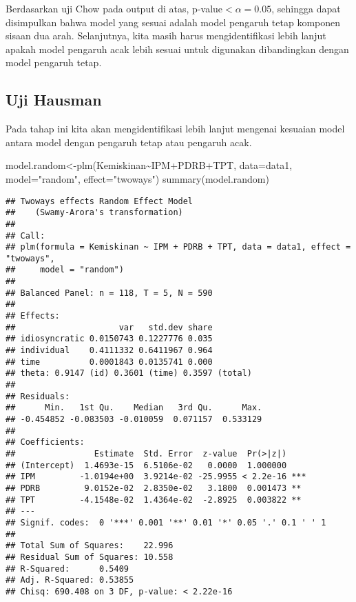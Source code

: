 \documentclass[
]{book}
\newenvironment{Shaded}{\begin{snugshade}}{\end{snugshade}}
\newcommand{\AttributeTok}[1]{\textcolor[rgb]{0.77,0.63,0.00}{#1}}
\newcommand{\FunctionTok}[1]{\textcolor[rgb]{0.00,0.00,0.00}{#1}}
\newcommand{\NormalTok}[1]{#1}
\newcommand{\OtherTok}[1]{\textcolor[rgb]{0.56,0.35,0.01}{#1}}
\newcommand{\SpecialCharTok}[1]{\textcolor[rgb]{0.00,0.00,0.00}{#1}}
\newcommand{\StringTok}[1]{\textcolor[rgb]{0.31,0.60,0.02}{#1}}
\begin{document}
Berdasarkan uji Chow pada output di atas, p-value\(<\alpha=0.05\), sehingga dapat disimpulkan bahwa model yang sesuai adalah model pengaruh tetap komponen sisaan dua arah. Selanjutnya, kita masih harus mengidentifikasi lebih lanjut apakah model pengaruh acak lebih sesuai untuk digunakan dibandingkan dengan model pengaruh tetap.

\hypertarget{uji-hausman}{%
\subsection{Uji Hausman}\label{uji-hausman}}

Pada tahap ini kita akan mengidentifikasi lebih lanjut mengenai kesuaian model antara model dengan pengaruh tetap atau pengaruh acak.

\begin{Shaded}
\begin{Highlighting}[]
\NormalTok{model.random}\OtherTok{\textless{}{-}}\FunctionTok{plm}\NormalTok{(Kemiskinan}\SpecialCharTok{\textasciitilde{}}\NormalTok{IPM}\SpecialCharTok{+}\NormalTok{PDRB}\SpecialCharTok{+}\NormalTok{TPT, }\AttributeTok{data=}\NormalTok{data1, }\AttributeTok{model=}\StringTok{"random"}\NormalTok{, }\AttributeTok{effect=}\StringTok{"twoways"}\NormalTok{)}
\FunctionTok{summary}\NormalTok{(model.random)}
\end{Highlighting}
\end{Shaded}

\begin{verbatim}
## Twoways effects Random Effect Model 
##    (Swamy-Arora's transformation)
## 
## Call:
## plm(formula = Kemiskinan ~ IPM + PDRB + TPT, data = data1, effect = "twoways", 
##     model = "random")
## 
## Balanced Panel: n = 118, T = 5, N = 590
## 
## Effects:
##                     var   std.dev share
## idiosyncratic 0.0150743 0.1227776 0.035
## individual    0.4111332 0.6411967 0.964
## time          0.0001843 0.0135741 0.000
## theta: 0.9147 (id) 0.3601 (time) 0.3597 (total)
## 
## Residuals:
##      Min.   1st Qu.    Median   3rd Qu.      Max. 
## -0.454852 -0.083503 -0.010059  0.071157  0.533129 
## 
## Coefficients:
##                Estimate  Std. Error  z-value  Pr(>|z|)    
## (Intercept)  1.4693e-15  6.5106e-02   0.0000  1.000000    
## IPM         -1.0194e+00  3.9214e-02 -25.9955 < 2.2e-16 ***
## PDRB         9.0152e-02  2.8350e-02   3.1800  0.001473 ** 
## TPT         -4.1548e-02  1.4364e-02  -2.8925  0.003822 ** 
## ---
## Signif. codes:  0 '***' 0.001 '**' 0.01 '*' 0.05 '.' 0.1 ' ' 1
## 
## Total Sum of Squares:    22.996
## Residual Sum of Squares: 10.558
## R-Squared:      0.5409
## Adj. R-Squared: 0.53855
## Chisq: 690.408 on 3 DF, p-value: < 2.22e-16
\end{verbatim}
\end{document}
